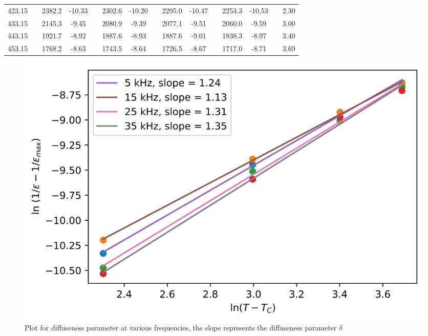 \documentclass[%
 aip,
 amsmath,amssymb,
 reprint, floatfix%
]{revtex4-1}
\begin{document}
\begin{table}[]
\begin{tabular}{@{}ccccccccccccccc@{}}
    423.15 &  & 2382.2 & -10.33 &  & 2302.6 & -10.20 &  & 2295.0 & -10.47 &  & 2253.3 & -10.53 &  & 2.30 \\
    433.15 &  & 2145.3 & -9.45 &  & 2080.9 & -9.39 &  & 2077.1 & -9.51 &  & 2060.0 & -9.59 &  & 3.00 \\
    443.15 &  & 1921.7 & -8.92 &  & 1887.6 & -8.93 &  & 1887.6 & -9.01 &  & 1838.3 & -8.97 &  & 3.40 \\
    453.15 &  & 1768.2 & -8.63 &  & 1743.5 & -8.64 &  & 1726.5 & -8.67 &  & 1717.0 & -8.71 &  & 3.69 \\ \bottomrule
    \end{tabular}
    \end{table}

    \begin{figure}
        \centering
        \includegraphics[scale = 0.56]{Figures/plot-diffuse.png}
        \caption{Plot for diffuseness parameter at various frequencies, the slope represents the diffuseness parameter $\delta$}
        \label{fig:delta}
    \end{figure}
\end{document}
